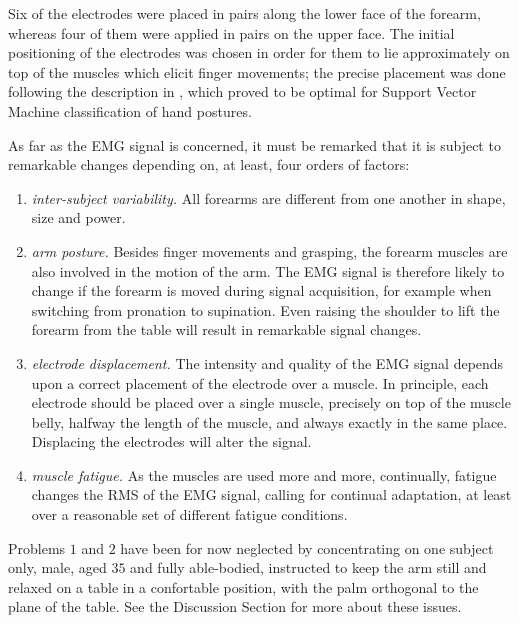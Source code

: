 Six of the electrodes were placed in pairs along the lower face of the
forearm, whereas four of them were applied in pairs on the upper
face. The initial positioning of the electrodes was chosen in order
for them to lie approximately on top of the muscles which elicit
finger movements; the precise placement was done following the
description in \cite{smagt}, which proved to be optimal for Support
Vector Machine classification of hand postures.

As far as the EMG signal is concerned, it must be remarked that it is
subject to remarkable changes depending on, at least, four orders of
factors:

\begin{enumerate}

  \item \emph{inter-subject variability.} All forearms are different
    from one another in shape, size and power.

  \item \emph{arm posture.} Besides finger movements and grasping, the
    forearm muscles are also involved in the motion of the arm. The
    EMG signal is therefore likely to change if the forearm is moved
    during signal acquisition, for example when switching from
    pronation to supination. Even raising the shoulder to lift the
    forearm from the table will result in remarkable signal changes.

  \item \emph{electrode displacement.} The intensity and quality of
    the EMG signal depends upon a correct placement of the electrode
    over a muscle. In principle, each electrode should be placed over
    a single muscle, precisely on top of the muscle belly, halfway the
    length of the muscle, and always exactly in the same
    place. Displacing the electrodes will alter the signal.

  \item \emph{muscle fatigue.} As the muscles are used more and more,
    continually, fatigue changes the RMS of the EMG signal, calling
    for continual adaptation, at least over a reasonable set of
    different fatigue conditions.

\end{enumerate}

Problems $1$ and $2$ have been for now neglected by concentrating on
one subject only, male, aged $35$ and fully able-bodied, instructed to
keep the arm still and relaxed on a table in a confortable position,
with the palm orthogonal to the plane of the table. See the Discussion
Section for more about these issues.

